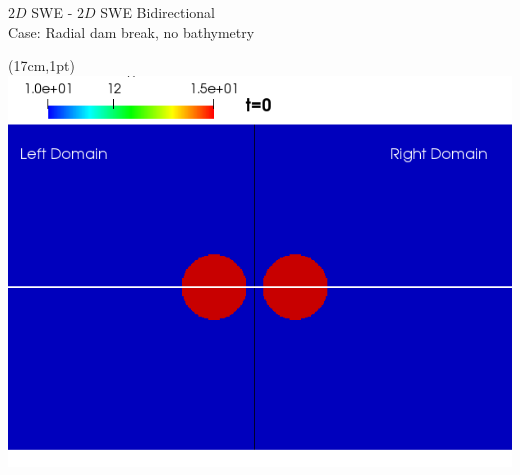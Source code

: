 \begin{frame}
\vspace{-0.5cm}
{\large \hspace{3mm} $2D$ SWE - $2D$ SWE Bidirectional}\\
Case: Radial dam break, no bathymetry
\begin{textblock*}{1cm}(17cm,1pt) %
\includegraphics[scale=0.22]{./Resources/Images/bidirectional0_g_0.png}
\end{textblock*}


\end{frame}
